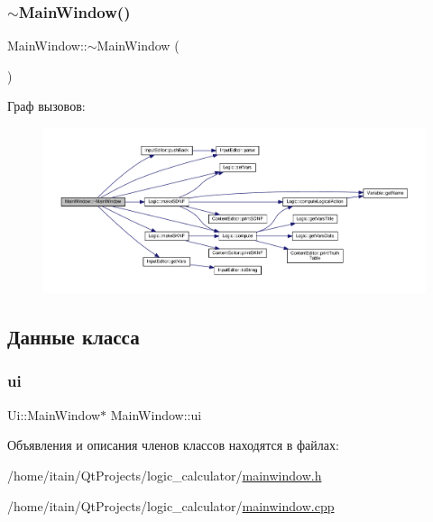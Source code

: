 \subsubsection{\texorpdfstring{$\sim$\+Main\+Window()}{~MainWindow()}}
{\footnotesize\ttfamily Main\+Window\+::$\sim$\+Main\+Window (\begin{DoxyParamCaption}{ }\end{DoxyParamCaption})}

Граф вызовов\+:\nopagebreak
\begin{figure}[H]
\begin{center}
\leavevmode
\includegraphics[width=350pt]{class_main_window_ae98d00a93bc118200eeef9f9bba1dba7_cgraph}
\end{center}
\end{figure}


\subsection{Данные класса}
\mbox{\label{class_main_window_a35466a70ed47252a0191168126a352a5}} 
\subsubsection{\texorpdfstring{ui}{ui}}
{\footnotesize\ttfamily Ui\+::\+Main\+Window$\ast$ Main\+Window\+::ui}



Объявления и описания членов классов находятся в файлах\+:\begin{DoxyCompactItemize}
\item 
/home/itain/\+Qt\+Projects/logic\+\_\+calculator/\hyperlink{mainwindow_8h}{mainwindow.\+h}\item 
/home/itain/\+Qt\+Projects/logic\+\_\+calculator/\hyperlink{mainwindow_8cpp}{mainwindow.\+cpp}\end{DoxyCompactItemize}
